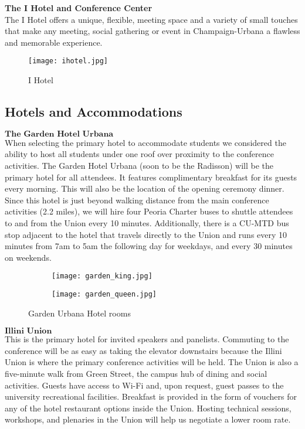\textbf{The I Hotel and Conference Center}\\
The I Hotel offers a unique, flexible, meeting space and a variety of small touches that make any meeting, social gathering or event in Champaign-Urbana a flawless and memorable experience.\\

\begin{figure}[H]
    \centering
    \texttt{[image: ihotel.jpg]}
    \caption{I Hotel}
    \label{fig:beckman}
\end{figure}

\subsection{Hotels and Accommodations}

$\textbf{The Garden Hotel Urbana}$\\
When selecting the primary hotel to accommodate students we considered the ability to host all students under one roof over proximity to the conference activities. The Garden Hotel Urbana (soon to be the Radisson) will be the primary hotel for all attendees. It features complimentary breakfast for its guests every morning. This will also be the location of the opening ceremony dinner. Since this hotel is just beyond walking distance from the main conference activities (2.2 miles), we will hire four Peoria Charter buses to shuttle attendees to and from the Union every 10 minutes. Additionally, there is a CU-MTD bus stop adjacent to the hotel that travels directly to the Union and runs every 10 minutes from 7am to 5am the following day for weekdays, and every 30 minutes on weekends.\\ 
\begin{figure}[H]
	\centering
	\begin{subfigure}{0.5\textwidth}
		\centering
		\texttt{[image: garden\_king.jpg]}
	\end{subfigure}%
	\begin{subfigure}{0.5\textwidth}
		\centering
		\texttt{[image: garden\_queen.jpg]}
	\end{subfigure}
	\caption{Garden Urbana Hotel rooms}		
\end{figure} 

$\textbf{Illini Union}$\\
This is the primary hotel for invited speakers and panelists. Commuting to the conference will be as easy as taking the elevator downstairs because the Illini Union is where the primary conference activities will be held. The Union is also a five-minute walk from Green Street, the campus hub of dining and social activities. Guests have access to Wi-Fi and, upon request, guest passes to the university recreational facilities. Breakfast is provided in the form of vouchers for any of the hotel restaurant options inside the Union. Hosting technical sessions, workshops, and plenaries in the Union will help us negotiate a lower room rate.\\

